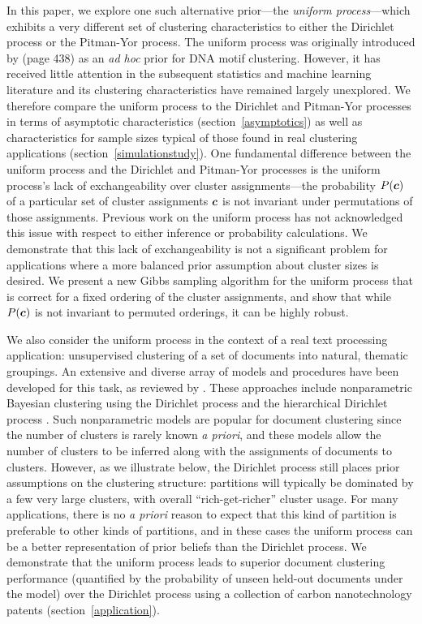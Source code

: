 \documentclass[twoside]{article}
\begin{document}
In this paper, we explore one such alternative prior---the
\emph{uniform process}---which exhibits a very different set of
clustering characteristics to either the Dirichlet process or the
Pitman-Yor process. The uniform process was originally introduced by
\cite{QinMcCTho03} (page 438) as an \emph{ad hoc} prior for DNA motif
clustering.  However, it has received little attention in the
subsequent statistics and machine learning literature and its
clustering characteristics have remained largely unexplored. We
therefore compare the uniform process to the Dirichlet and Pitman-Yor
processes in terms of asymptotic characteristics
(section~\ref{asymptotics}) as well as characteristics for sample
sizes typical of those found in real clustering applications
(section~\ref{simulationstudy}). One fundamental difference between
the uniform process and the Dirichlet and Pitman-Yor processes is the
uniform process's lack of exchangeability over cluster
assignments---the probability $P(\boldsymbol{c})$ of a particular set of cluster
assignments $\boldsymbol{c}$ is not invariant under permutations of those
assignments. Previous work on the uniform process has not acknowledged
this issue with respect to either inference or probability
calculations. We demonstrate that this lack of exchangeability is not
a significant problem for applications where a more balanced prior
assumption about cluster sizes is desired. We present a new Gibbs
sampling algorithm for the uniform process that is correct for a fixed
ordering of the cluster assignments, and show that while $P(\boldsymbol{c})$ is
not invariant to permuted orderings, it can be highly robust.

We also consider the uniform process in the context of a real text
processing application: unsupervised clustering of a set of documents
into natural, thematic groupings.  An extensive and diverse array of
models and procedures have been developed for this task, as reviewed
by \cite{AndFox07}. These approaches include nonparametric Bayesian
clustering using the Dirichlet process \cite[]{ZhaGhaYan05} and the
hierarchical Dirichlet process \cite[]{TehJorBea06}. Such
nonparametric models are popular for document clustering since the
number of clusters is rarely known \emph{a priori}, and these models
allow the number of clusters to be inferred along with the assignments
of documents to clusters. However, as we illustrate below, the
Dirichlet process still places prior assumptions on the clustering
structure: partitions will typically be dominated by a few very large
clusters, with overall ``rich-get-richer'' cluster usage. For many
applications, there is no \emph{a priori} reason to expect that this
kind of partition is preferable to other kinds of partitions, and in
these cases the uniform process can be a better representation of
prior beliefs than the Dirichlet process. We demonstrate that the
uniform process leads to superior document clustering performance
(quantified by the probability of unseen held-out documents under the
model) over the Dirichlet process using a collection of carbon
nanotechnology patents (section~\ref{application}).
\end{document}
